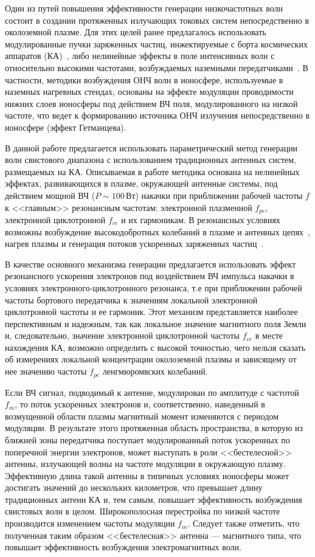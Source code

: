 \documentclass[10pt]{disser}
\begin{document}
Один из путей повышения эффективности генерации низкочастотных волн состоит в создании протяженных излучающих токовых систем непосредственно  в околоземной плазме. Для этих целей ранее предлагалось использовать модулированные пучки заряженных частиц, инжектируемые с борта космических аппаратов (КА)~\cite{Starodubtsev, Holzworth}, либо нелинейные эффекты в поле интенсивных волн с относительно высокими частотами, возбуждаемых наземными передатчиками~\cite{HAARP, SPS}. В частности, методики возбуждения ОНЧ волн в ионосфере, используемые в наземных нагревных стендах, основаны на эффекте модуляции проводимости нижних слоев ионосферы под действием ВЧ поля, модулированного на низкой частоте, что ведет к формированию источника ОНЧ излучения непосредственно в ионосфере (эффект Гетманцева).

В данной работе  предлагается использовать параметрический метод генерации волн свистового диапазона с использованием традиционных антенных систем, размещаемых на КА. Описываемая в работе методика основана  на  нелинейных эффектах, развивающихся в плазме, окружающей антенные системы, под действием мощной ВЧ ($P\sim100$\,Вт) накачки  при приближении рабочей частоты $f$ к <<главным>> резонансным частотам: электронной плазменной $f_{pe}$, электронной циклотронной $f_{ce}$ и их гармоникам. В резонансных условиях возможны возбуждение высокодобротных колебаний в плазме и антенных цепях~\cite{WHISPER}, нагрев плазмы и генерация потоков ускоренных заряженных частиц~\cite{Pulinets,Galperin,Huang,James}.

В качестве основного механизма генерации предлагается использовать эффект резонансного ускорения электронов под воздействием ВЧ импульса накачки в условиях электронного-циклотронного резонанса, т.е при приближении рабочей частоты бортового передатчика к значениям локальной электронной циклотронной частоты и ее гармоник.  Этот механизм представляется наиболее перспективным и надежным, так как локальное значение магнитного поля Земли и, следовательно, значение электронной циклотронной частоты $f_{ce}$ в месте нахождения КА, возможно определить с высокой точностью, чего нельзя сказать об измерениях локальной концентрации околоземной плазмы и зависящему от нее значению частоты $f_{pe}$ ленгмюромвских колебаний. 

Если ВЧ сигнал, подводимый к антенне, модулирован по амплитуде с частотой $f_{m}$, то поток ускоренных электронов и, соответственно, наведенный в возмущенной области плазмы магнитный момент изменяются с периодом модуляции. В результате этого протяженная область пространства, в которую из ближней зоны передатчика поступает модулированный поток ускоренных по поперечной энергии электронов, может выступать в роли <<бестелесной>> антенны, излучающей волны на частоте модуляции в окружающую плазму. Эффективную длина такой антенны в типичных условиях ионосферы может достигать значений до нескольких километров, что превышает длину традиционных антенн КА и, тем самым, повышает эффективность возбуждения свистовых волн в целом. Широкополосная перестройка по низкой частоте производится изменением частоты модуляции $f_{m}$. Следует также отметить, что полученная таким образом <<бестелесная>> антенна --- магнитного типа, что повышает эффективность возбуждения электромагнитных волн.
\end{document}
